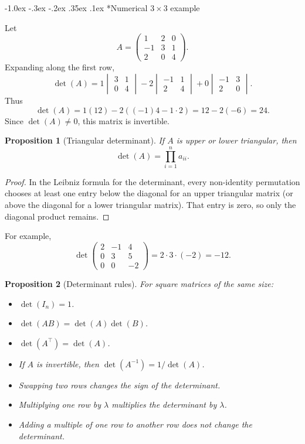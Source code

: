 \documentclass[10pt]{article}
\makeatletter
\renewcommand\subsection{\@startsection{subsection}{2}{\z@}%
  {-1.0ex \@plus -.3ex \@minus -.2ex}%
  {.35ex \@plus .1ex}%
  {\normalfont\normalsize\bfseries}}
\theoremstyle{compactdefinition}
\theoremstyle{compactproposition}
\newtheorem{proposition}{Proposition}[section]
\makeatother
\begin{document}
\subsection*{Numerical $3\times3$ example}

Let
\[
A=
\begin{pmatrix}
1&2&0\\
-1&3&1\\
2&0&4
\end{pmatrix}.
\]
Expanding along the first row,
\[
\det(A)
=
1
\begin{vmatrix}
3&1\\
0&4
\end{vmatrix}
-
2
\begin{vmatrix}
-1&1\\
2&4
\end{vmatrix}
+0
\begin{vmatrix}
-1&3\\
2&0
\end{vmatrix}.
\]
Thus
\[
\det(A)=1(12)-2((-1)4-1\cdot2)=12-2(-6)=24.
\]
Since $\det(A)\neq0$, this matrix is invertible.

\begin{proposition}[Triangular determinant]
If $A$ is upper or lower triangular, then
\[
\det(A)=\prod_{i=1}^n a_{ii}.
\]
\end{proposition}

\begin{proof}
In the Leibniz formula for the determinant, every non-identity permutation
chooses at least one entry below the diagonal for an upper triangular matrix
(or above the diagonal for a lower triangular matrix). That entry is zero, so
only the diagonal product remains.
\end{proof}

For example,
\[
\det
\begin{pmatrix}
2&-1&4\\
0&3&5\\
0&0&-2
\end{pmatrix}
=2\cdot3\cdot(-2)=-12.
\]

\begin{proposition}[Determinant rules]
For square matrices of the same size:
\begin{itemize}
\item $\det(I_n)=1$.
\item $\det(AB)=\det(A)\det(B)$.
\item $\det(A^\top)=\det(A)$.
\item If $A$ is invertible, then $\det(A^{-1})=1/\det(A)$.
\item Swapping two rows changes the sign of the determinant.
\item Multiplying one row by $\lambda$ multiplies the determinant by $\lambda$.
\item Adding a multiple of one row to another row does not change the determinant.
\end{itemize}
\end{proposition}
\end{document}
